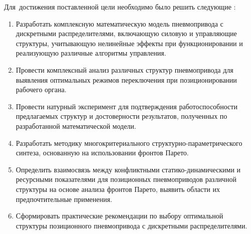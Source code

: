 Для~достижения поставленной цели необходимо было решить следующие {\tasks}:
\begin{enumerate}[beginpenalty=10000] %
	\item Разработать комплексную математическую модель пневмопривода с дискретными распределителями,
	      включающую силовую и управляющие структуры, учитывающую нелинейные эффекты
	      при функционировании и реализующую различные алгоритмы управления.

	\item Провести комплексный анализ различных структур пневмопривода для выявления оптимальных
	      режимов переключения при позиционировании рабочего органа.

	\item Провести натурный эксперимент для подтверждения работоспособности предлагаемых структур
	      и достоверности результатов, полученных по разработанной математической модели.

	\item Разработать методику многокритериального структурно-\allowbreak па\-ра\-ме\-три\-че\-ско\-го
	      синтеза, основанную на использовании фронтов Парето.

	\item Определить взаимосвязь между конфликтными статико-динамическими и ресурсными
	      показателями для позиционных пневмоприводов различной структуры на
	      основе анализа фронтов Парето, выявить области их предпочтительные применения.

	\item Сформировать практические рекомендации по выбору оптимальной структуры
	      позиционного пневмопривода с дискретными распределителями.

\end{enumerate}


